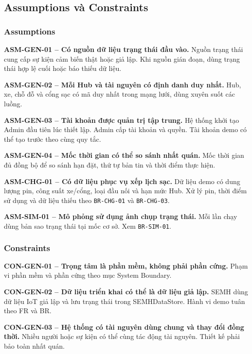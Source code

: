 \subsection{Assumptions và Constraints}

\subsubsection*{Assumptions}

\noindent\textbf{ASM-GEN-01 -- Có nguồn dữ liệu trạng thái đầu vào.} Nguồn trạng thái cung cấp sự kiện cảm biến thật hoặc giả lập. Khi nguồn gián đoạn, dùng trạng thái hợp lệ cuối hoặc báo thiếu dữ liệu.

\medskip
\noindent\textbf{ASM-GEN-02 -- Mỗi Hub và tài nguyên có định danh duy nhất.} Hub, xe, chỗ đỗ và cổng sạc có mã duy nhất trong mạng lưới, dùng xuyên suốt các luồng.

\medskip
\noindent\textbf{ASM-GEN-03 -- Tài khoản được quản trị tập trung.} Hệ thống khởi tạo Admin đầu tiên lúc thiết lập. Admin cấp tài khoản và quyền. Tài khoản demo có thể tạo trước theo cùng quy tắc.

\medskip
\noindent\textbf{ASM-GEN-04 -- Mốc thời gian có thể so sánh nhất quán.} Mốc thời gian đủ đồng bộ để so sánh hạn đặt, thứ tự bản tin và thời điểm thực hiện.

\medskip
\noindent\textbf{ASM-CHG-01 -- Có dữ liệu phục vụ xếp lịch sạc.} Dữ liệu demo có dung lượng pin, công suất xe/cổng, loại đầu nối và hạn mức Hub. Xử lý pin, thời điểm sử dụng và dữ liệu thiếu theo \texttt{BR-CHG-01} và \texttt{BR-CHG-03}.

\medskip
\noindent\textbf{ASM-SIM-01 -- Mô phỏng sử dụng ảnh chụp trạng thái.} Mỗi lần chạy dùng bản sao trạng thái tại mốc cơ sở. Xem \texttt{BR-SIM-01}.

\subsubsection*{Constraints}

\noindent\textbf{CON-GEN-01 -- Trọng tâm là phần mềm, không phải phần cứng.} Phạm vi phần mềm và phần cứng theo mục System Boundary.

\medskip
\noindent\textbf{CON-GEN-02 -- Dữ liệu triển khai có thể là dữ liệu giả lập.} SEMH dùng dữ liệu IoT giả lập và lưu trạng thái trong SEMHDataStore. Hành vi demo tuân theo FR và BR.

\medskip
\noindent\textbf{CON-GEN-03 -- Hệ thống có tài nguyên dùng chung và thay đổi đồng thời.} Nhiều người hoặc sự kiện có thể cùng tác động tài nguyên. Thiết kế phải bảo toàn nhất quán.

